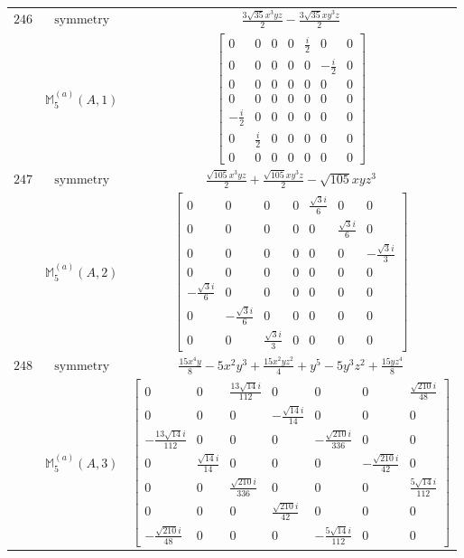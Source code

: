 \documentclass[fleqn,8pt,landscape]{jsarticle}
\begin{document}
\begin{longtable}{ccc}
$ 246 $ & $ \text{symmetry} $ & $ \frac{3 \sqrt{35} x^{3} y z}{2} - \frac{3 \sqrt{35} x y^{3} z}{2} $ \\
$  $ & $ \mathbb{M}_{5}^{(a)}(A,1) $ & $ \begin{bmatrix} 0 & 0 & 0 & 0 & \frac{i}{2} & 0 & 0 \\ 0 & 0 & 0 & 0 & 0 & - \frac{i}{2} & 0 \\ 0 & 0 & 0 & 0 & 0 & 0 & 0 \\ 0 & 0 & 0 & 0 & 0 & 0 & 0 \\ - \frac{i}{2} & 0 & 0 & 0 & 0 & 0 & 0 \\ 0 & \frac{i}{2} & 0 & 0 & 0 & 0 & 0 \\ 0 & 0 & 0 & 0 & 0 & 0 & 0 \end{bmatrix} $ \\ \hline
$ 247 $ & $ \text{symmetry} $ & $ \frac{\sqrt{105} x^{3} y z}{2} + \frac{\sqrt{105} x y^{3} z}{2} - \sqrt{105} x y z^{3} $ \\
$  $ & $ \mathbb{M}_{5}^{(a)}(A,2) $ & $ \begin{bmatrix} 0 & 0 & 0 & 0 & \frac{\sqrt{3} i}{6} & 0 & 0 \\ 0 & 0 & 0 & 0 & 0 & \frac{\sqrt{3} i}{6} & 0 \\ 0 & 0 & 0 & 0 & 0 & 0 & - \frac{\sqrt{3} i}{3} \\ 0 & 0 & 0 & 0 & 0 & 0 & 0 \\ - \frac{\sqrt{3} i}{6} & 0 & 0 & 0 & 0 & 0 & 0 \\ 0 & - \frac{\sqrt{3} i}{6} & 0 & 0 & 0 & 0 & 0 \\ 0 & 0 & \frac{\sqrt{3} i}{3} & 0 & 0 & 0 & 0 \end{bmatrix} $ \\ \hline
$ 248 $ & $ \text{symmetry} $ & $ \frac{15 x^{4} y}{8} - 5 x^{2} y^{3} + \frac{15 x^{2} y z^{2}}{4} + y^{5} - 5 y^{3} z^{2} + \frac{15 y z^{4}}{8} $ \\
$  $ & $ \mathbb{M}_{5}^{(a)}(A,3) $ & $ \begin{bmatrix} 0 & 0 & \frac{13 \sqrt{14} i}{112} & 0 & 0 & 0 & \frac{\sqrt{210} i}{48} \\ 0 & 0 & 0 & - \frac{\sqrt{14} i}{14} & 0 & 0 & 0 \\ - \frac{13 \sqrt{14} i}{112} & 0 & 0 & 0 & - \frac{\sqrt{210} i}{336} & 0 & 0 \\ 0 & \frac{\sqrt{14} i}{14} & 0 & 0 & 0 & - \frac{\sqrt{210} i}{42} & 0 \\ 0 & 0 & \frac{\sqrt{210} i}{336} & 0 & 0 & 0 & \frac{5 \sqrt{14} i}{112} \\ 0 & 0 & 0 & \frac{\sqrt{210} i}{42} & 0 & 0 & 0 \\ - \frac{\sqrt{210} i}{48} & 0 & 0 & 0 & - \frac{5 \sqrt{14} i}{112} & 0 & 0 \end{bmatrix} $ \\ \hline

\end{longtable}
\end{document}
